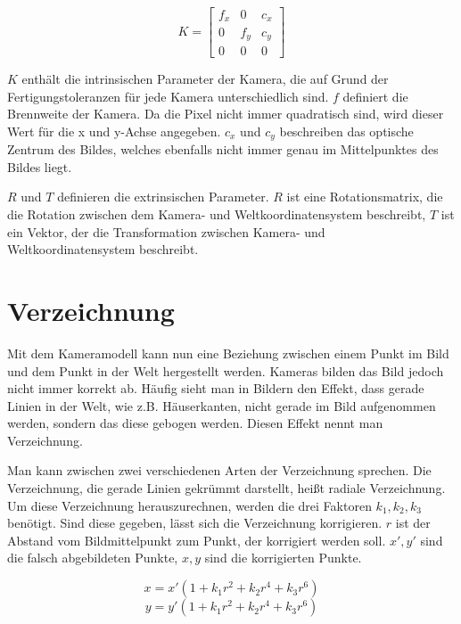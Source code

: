 \begin{equation}
  K = 
  \begin{bmatrix}
  	f_x & 0 & c_x \\
  	0 & f_y & c_y \\
  	0 & 0 & 0
  \end{bmatrix}
\end{equation}

$K$ enthält die intrinsischen Parameter der Kamera, die auf Grund der Fertigungstoleranzen für jede Kamera unterschiedlich sind. $f$ definiert die Brennweite der Kamera. Da die Pixel nicht immer quadratisch sind, wird dieser Wert für die x und y-Achse angegeben. $c_x$ und $c_y$ beschreiben das optische Zentrum des Bildes, welches ebenfalls nicht immer genau im Mittelpunktes des Bildes liegt.

$R$ und $T$ definieren die extrinsischen Parameter. $R$ ist eine Rotationsmatrix, die die Rotation zwischen dem Kamera- und Weltkoordinatensystem beschreibt, $T$ ist ein Vektor, der die Transformation zwischen Kamera- und Weltkoordinatensystem beschreibt.

\section{Verzeichnung} %
\label{sec:verzeichnung}
Mit dem Kameramodell kann nun eine Beziehung zwischen einem Punkt im Bild und dem Punkt in der Welt hergestellt werden. Kameras bilden das Bild jedoch nicht immer korrekt ab. Häufig sieht man in Bildern den Effekt, dass gerade Linien in der Welt, wie z.B. Häuserkanten, nicht gerade im Bild aufgenommen werden, sondern das diese gebogen werden. Diesen Effekt nennt man Verzeichnung.

Man kann zwischen zwei verschiedenen Arten der Verzeichnung sprechen. Die Verzeichnung, die gerade Linien gekrümmt darstellt, heißt radiale Verzeichnung. Um diese Verzeichnung herauszurechnen, werden die drei Faktoren $k_1, k_2, k_3$ benötigt. Sind diese gegeben, lässt sich die Verzeichnung korrigieren. $r$ ist der Abstand vom Bildmittelpunkt zum Punkt, der korrigiert werden soll. $x', y'$ sind die falsch abgebildeten Punkte, $x,y$ sind die korrigierten Punkte.

\begin{equation}
	x = x'(1 + k_1 r^2 + k_2 r^4 + k_3 r^6)
\end{equation}
\begin{equation}
	y = y'(1 + k_1 r^2 + k_2 r^4 + k_3 r^6)
\end{equation}

